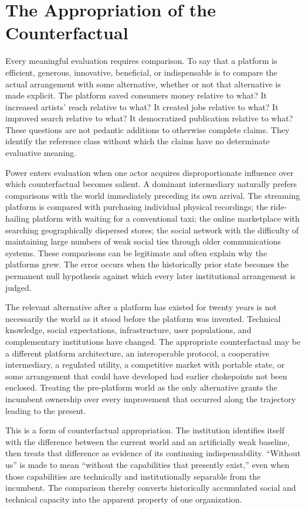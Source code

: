 \documentclass[11pt]{article}
\begin{document}
\section{The Appropriation of the Counterfactual}

Every meaningful evaluation requires comparison. To say that a platform is efficient, generous, innovative, beneficial, or indispensable is to compare the actual arrangement with some alternative, whether or not that alternative is made explicit. The platform saved consumers money relative to what? It increased artists' reach relative to what? It created jobs relative to what? It improved search relative to what? It democratized publication relative to what? These questions are not pedantic additions to otherwise complete claims. They identify the reference class without which the claims have no determinate evaluative meaning.

Power enters evaluation when one actor acquires disproportionate influence over which counterfactual becomes salient. A dominant intermediary naturally prefers comparisons with the world immediately preceding its own arrival. The streaming platform is compared with purchasing individual physical recordings; the ride-hailing platform with waiting for a conventional taxi; the online marketplace with searching geographically dispersed stores; the social network with the difficulty of maintaining large numbers of weak social ties through older communications systems. These comparisons can be legitimate and often explain why the platforms grew. The error occurs when the historically prior state becomes the permanent null hypothesis against which every later institutional arrangement is judged.

The relevant alternative after a platform has existed for twenty years is not necessarily the world as it stood before the platform was invented. Technical knowledge, social expectations, infrastructure, user populations, and complementary institutions have changed. The appropriate counterfactual may be a different platform architecture, an interoperable protocol, a cooperative intermediary, a regulated utility, a competitive market with portable state, or some arrangement that could have developed had earlier chokepoints not been enclosed. Treating the pre-platform world as the only alternative grants the incumbent ownership over every improvement that occurred along the trajectory leading to the present.

This is a form of counterfactual appropriation. The institution identifies itself with the difference between the current world and an artificially weak baseline, then treats that difference as evidence of its continuing indispensability. ``Without us'' is made to mean ``without the capabilities that presently exist,'' even when those capabilities are technically and institutionally separable from the incumbent. The comparison thereby converts historically accumulated social and technical capacity into the apparent property of one organization.
\end{document}
